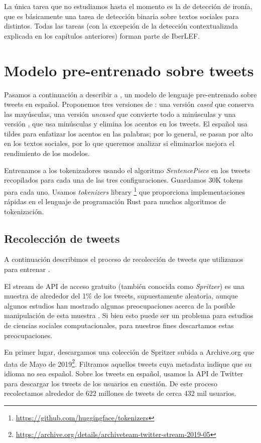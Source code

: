 La única tarea que no estudiamos hasta el momento es la de detección de ironía, que es básicamente una tarea de detección binaria sobre textos sociales para distintos. Todas las tareas (con la excepción de la detección contextualizada explicada en los capítulos anteriores) forman parte de IberLEF.




\section{Modelo pre-entrenado sobre tweets}
\label{sec:robertuito_pretrained_model}

Pasamos a continuación a describir a \robertuito{}, un modelo de lenguaje pre-entrenado sobre tweets en español. Proponemos tres versiones de \robertuito{}: una versión \emph{cased} que conserva las mayúsculas, una versión \emph{uncased} que convierte todo a minúsculas y una versión \deacc{}, que usa minúsculas y elimina los acentos en los tweets. El español usa tildes para enfatizar los acentos en las palabras; por lo general, se pasan por alto en los textos sociales, por lo que queremos analizar si eliminarlos mejora el rendimiento de los modelos.

Entrenamos a los tokenizadores usando el algoritmo \emph{SentencePiece} en los tweets recopilados para cada una de las tres configuraciones. Guardamos 30K tokens para cada uno. Usamos \emph{tokenizers} library \footnote{\url{https://github.com/huggingface/tokenizers}} que proporciona implementaciones rápidas en el lenguaje de programación Rust para muchos algoritmos de tokenización.


\subsection{Recolección de tweets}

A continuación describimos el proceso de recolección de tweets que utilizamos para entrenar \robertuito{}.

El stream de API de acceso gratuito (también conocida como \emph{Spritzer}) es una muestra de alrededor del 1\% de los tweets, supuestamente aleatoria, aunque algunos estudios han mostrado algunas preocupaciones acerca de la posible manipulación de esta muestra \cite{pfeffer2018tampering}. Si bien esto puede ser un problema para estudios de ciencias sociales computacionales, para nuestros fines descartamos estas preocupaciones.

En primer lugar, descargamos una colección de Spritzer subida a Archive.org que data de Mayo de 2019\footnote{\url{https://archive.org/details/archiveteam-twitter-stream-2019-05}}. Filtramos aquellos tweets cuya metadata indique que su idioma no sea español. Sobre los tweets en español, usamos la API de Twitter para descargar los tweets de los usuarios en cuestión. De este proceso recolectamos alrededor de 622 millones de tweets de cerca 432 mil usuarios.

